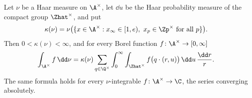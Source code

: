 Let $\nu$ be a Haar measure on $\A^\times$, let $\dd u$ be the Haar probability measure of the compact group
$\Zhat^\times$, and put
\[
  \kappa(\nu)=\nu\bigl(\{x\in\A^\times:x_\infty\in[1,e),\ x_p\in\Zp^\times\text{ for all }p\}\bigr).
\]
Then $0<\kappa(\nu)<\infty$, and for every Borel function $f\colon\A^\times\to[0,\infty]$
\[
  \int_{\A^\times}f\,\dd\nu=\kappa(\nu)\sum_{q\in\Q^\times}\int_0^\infty\int_{\Zhat^\times}f\bigl(q\cdot(r,u)\bigr)\,\dd u\,
  \frac{\dd r}{r}.
\]
The same formula holds for every $\nu$-integrable $f\colon\A^\times\to\C$, the series converging absolutely.
